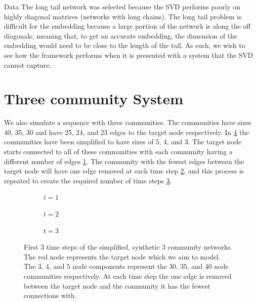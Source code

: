 \documentclass[12pt]{amsbook}
\begin{document}
\begin{chapter}{Data}
        The long tail network was selected because the SVD performs poorly on highly diagonal matrices (networks with long chains).  The long tail problem is difficult for the embedding because a large portion of the network is along the off diagonals; meaning that, to get an accurate embedding, the dimension of the embedding would need to be close to the length of the tail. As such, we wish to see how the framework performs when it is presented with a system that the SVD cannot capture.

    \section{Three community System}
    We also simulate a sequence with three communities. The communities have sizes 40, 35, 30 and have 25, 24, and 23 edges to the target node respectively. In \cref{3community train series} the communities have been simplified to have sizes of 5, 4, and 3. The target node starts connected to all of these communities with each community having a different number of edges \cref{3community train series a}. The community with the fewest edges between the target node will have one edge removed at each time step \cref{3community train series b}, and this process is repeated to create the required number of time steps \cref{3community train series c}.  
    \begin{figure}[H]
        \centering
        \centering
        \begin{subfigure}[c]{0.3\textwidth}
            \centering
            \resizebox{.6\width}{!}{}
            \caption{$t=1$}
            \label{3community train series a}
        \end{subfigure}
        \hfill
        \centering
        \begin{subfigure}[c]{0.3\textwidth}
            \centering
            \resizebox{.6\width}{!}{}
            \caption{$t=2$}
            \label{3community train series b}            
        \end{subfigure}
        \hfill
        \centering
        \begin{subfigure}[c]{0.3\textwidth}
            \centering
            \resizebox{.6\width}{!}{}
            \caption{$t=3$}
            \label{3community train series c}
        \end{subfigure}
        \caption{First 3 time steps of the simplified, synthetic 3 community networks. The red node represents the target node which we aim to model. The 3, 4, and 5 node components represent the 30, 35, and 40 node communities respectively. At each time step the one edge is removed between the target node and the community it has the fewest connections with.}
        \label{3community train series}
    \end{figure}
     

\end{chapter}
\end{document}
